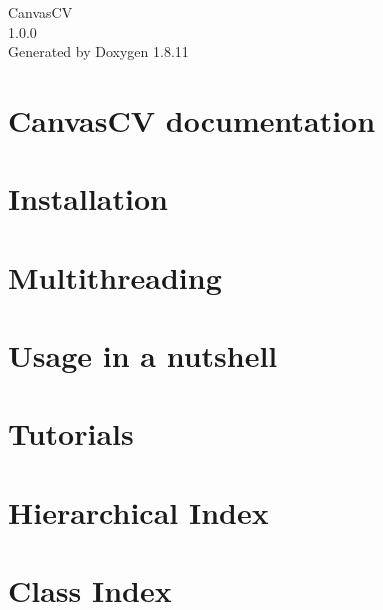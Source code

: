 \documentclass[twoside]{book}
\newcommand{\+}{\discretionary{\mbox{\scriptsize$\hookleftarrow$}}{}{}}
\newcommand{\clearemptydoublepage}{%
  \newpage{\pagestyle{empty}\cleardoublepage}%
}
\begin{document}
\hypersetup{pageanchor=false,
             bookmarksnumbered=true,
             pdfencoding=unicode
            }
\begin{titlepage}
\vspace*{7cm}
\begin{center}%
{\Large Canvas\+CV \\[1ex]\large 1.\+0.\+0 }\\
\vspace*{1cm}
{\large Generated by Doxygen 1.8.11}\\
\end{center}
\end{titlepage}
\clearemptydoublepage
\tableofcontents
\clearemptydoublepage
{}
\hypersetup{pageanchor=true}

\chapter{Canvas\+CV documentation}
\label{index}\hypertarget{index}{}
\chapter{Installation}
\label{install}
\hypertarget{install}{}

\chapter{Multithreading}
\label{multithreading}
\hypertarget{multithreading}{}

\chapter{Usage in a nutshell}
\label{nutshell}
\hypertarget{nutshell}{}

\chapter{Tutorials}
\label{tutorials}
\hypertarget{tutorials}{}

\chapter{Hierarchical Index}

\chapter{Class Index}

\end{document}
